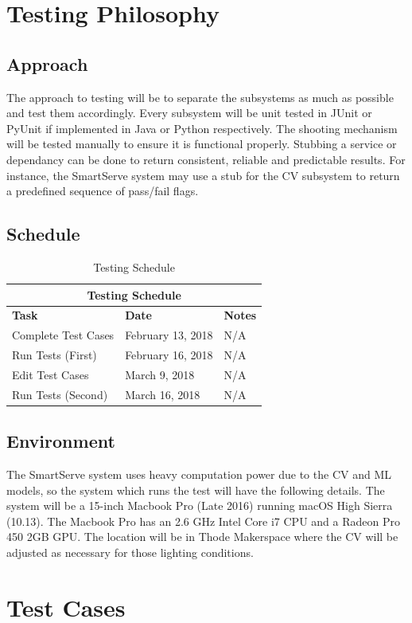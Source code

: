 \documentclass[11pt]{article}
\begin{document}
\section{Testing Philosophy}
\subsection{Approach}
The approach to testing will be to separate the subsystems as much as possible and test them accordingly. Every subsystem will be unit tested in JUnit or PyUnit if implemented in Java or Python respectively. The shooting mechanism will be tested manually to ensure it is functional properly. Stubbing a service or dependancy can be done to return consistent, reliable and predictable results. For instance, the SmartServe system may use a stub for the CV subsystem to return a predefined sequence of pass/fail flags.
\subsection{Schedule}
\begin{table}[H]
\centering
\caption{Testing Schedule}
\label{my-label}
\begin{tabular}{|l|l|l|}
\hline
\multicolumn{3}{|c|}{\textbf{Testing Schedule}}  \\ \hline
\textbf{Task} & \textbf{Date} & \textbf{Notes} \\ \hline
Complete Test Cases & February 13, 2018 & N/A \\ \hline
Run Tests (First) & February 16, 2018 & N/A \\ \hline
Edit Test Cases & March 9, 2018 & N/A \\ \hline
Run Tests (Second) & March 16, 2018 & N/A \\ \hline
\end{tabular}
\end{table}
\subsection{Environment}
The SmartServe system uses heavy computation power due to the CV and ML models, so the system which runs the test will have the following details. The system will be a 15-inch Macbook Pro (Late 2016) running macOS High Sierra (10.13). The Macbook Pro has an 2.6 GHz Intel Core i7 CPU and a Radeon Pro 450 2GB GPU. The location will be in Thode Makerspace where the CV will be adjusted as necessary for those lighting conditions. 
\section{Test Cases}
\end{document}
